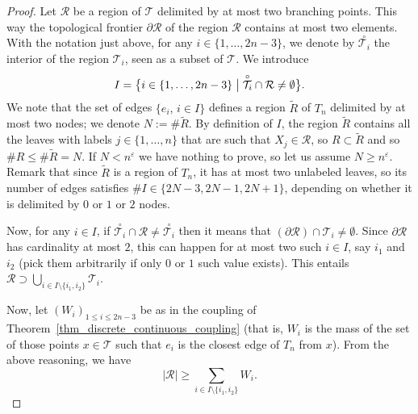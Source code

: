 \documentclass[JEP,XML,SOM,Unicode,NoFloatCountersInSection,published]{cedram}
\newcommand{\benstq}[2]{\bigl\{#1\bigm|#2\bigr\}}
\newcommand{\Tt}{\mathcal{T}}
\newcommand{\Rr}{\mathcal{R}}
\let\eps\varepsilon
\theoremstyle{plain}
\theoremstyle{definition}
\begin{document}
\begin{proof}
Let $\Rr$ be a region of $\Tt$ delimited by at most two branching points.
This way the topological frontier $\partial \Rr$ of the region $\Rr$ contains at most two elements.
With the notation just above, for any $i\in\{1,\dots,2n-3\}$, we denote by $\overset{\circ}{\Tt_i}$ the interior of the region $\Tt_i$, seen as a subset of $\Tt$.
We introduce
\begin{align*}
I=\benstq{i\in \{1,\dots,2n-3\}}{\overset{\circ}{\Tt_i} \cap \Rr \neq \emptyset }.
\end{align*}
We note that the set of edges $\{e_i,\, i\in I\}$ defines a region $\tilde{R}$ of $T_n$ delimited by at most two nodes; we denote $N:=\#\tilde{R}$.
By definition of $I$, the region $\tilde{R}$ contains all the leaves with labels $j \in \{1,\dots,n\}$ that are such that $X_j \in \Rr$, so $R\subset \tilde{R}$ and so $\#R\leq \#\tilde{R}=N$.
If $N<n^\eps$ we have nothing to prove, so let us assume $N \geq n^{\eps}$.
Remark that since $\tilde{R}$ is a region of $T_n$, it has at most two unlabeled leaves, so its number of edges satisfies $\#I\in \{2N-3,2N-1,2N+1\}$, depending on whether it is delimited by $0$ or $1$ or $2$ nodes.

Now, for any $i\in I$, if $\overset{\circ}{\Tt_i} \cap \Rr \neq \overset{\circ}{\Tt_i}$ then it means that $(\partial \Rr)\cap \Tt_i \neq \emptyset$.
Since $\partial \Rr$ has cardinality at most $2$, this can happen for at most two such $i\in I$, say $i_1$ and $i_2$ (pick them arbitrarily if only $0$ or $1$ such value exists).
This entails $\Rr\supset \bigcup_{i\in I \setminus \{i_1,i_2\}} \Tt_i$.

Now, let $(W_i)_{1\leq i \leq 2n-3}$ be as in the coupling of Theorem~\ref{thm_discrete_continuous_coupling} (that is, $W_i$ is the mass of the set of those points $x \in \Tt$ such that $e_i$ is the closest edge of $T_n$ from $x$).
From the above reasoning, we have
\begin{equation}\label{eqn:mass_region_and_W}
\left| \Rr \right|\geq \sum_{i \in I\setminus\{i_1,i_2\}} W_i.
\end{equation}


\end{proof}
\end{document}
